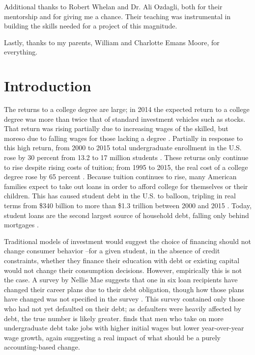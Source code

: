 \documentclass[12pt]{article}
\begin{document}
	Additional thanks to Robert Whelan and Dr. Ali Ozdagli, both for their mentorship and for giving me a chance. Their teaching was instrumental in building the skills needed for a project of this magnitude. 
	
	Lastly, thanks to my parents, William and Charlotte Emans Moore, for everything. 
	
	\pagebreak
	
	\section{Introduction}
	
	The returns to a college degree are large; in 2014 the expected return to a college degree was more than twice that of standard investment vehicles such as stocks. That return was rising partially due to increasing wages of the skilled, but moreso due to falling wages for those lacking a degree \parencite{abel2014}. Partially in response to this high return, from 2000 to 2015 total undergraduate enrollment in the U.S. rose by 30 percent from 13.2 to 17 million students \parencite{mcfarland2017}. These returns only continue to rise despite rising costs of tuition; from 1995 to 2015, the real cost of a college degree rose by 65 percent \parencite{doe2016}. Because tuition continues to rise, many American families expect to take out loans in order to afford college for themselves or their children. This has caused student debt in the U.S. to balloon, tripling in real terms from \$340 billion to more than \$1.3 trillion between 2000 and 2015 \parencite{feiveson2018}. Today, student loans are the second largest source of household debt, falling only behind mortgages \parencite{dynarski2015}. 
	
	Traditional models of investment would suggest the choice of financing should not change consumer behavior \parencite{modigliani1958}--for a given student, in the absence of credit constraints, whether they finance their education with debt or existing capital would not change their consumption decisions. However, empirically this is not the case. A survey by Nellie Mae suggests that one in six loan recipients have changed their career plans due to their debt obligation, though how those plans have changed was not specified in the survey \parencite{baum2003}. This survey contained only those who had not yet defaulted on their debt; as defaulters were heavily affected by debt, the true number is likely greater. \textcite{minicozzi2005} finds that men who take on more undergraduate debt take jobs with higher initial wages but lower year-over-year wage growth, again suggesting a real impact of what should be a purely accounting-based change. 
	
\end{document}
